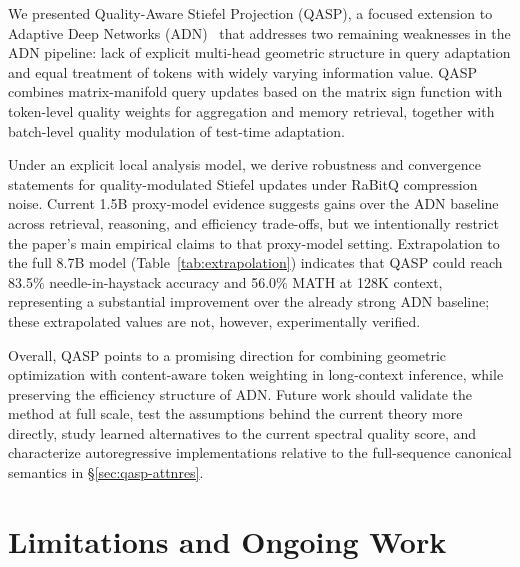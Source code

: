 \documentclass[twocolumn]{article}
\begin{document}
We presented Quality-Aware Stiefel Projection (QASP), a focused extension to Adaptive Deep Networks (ADN)~\cite{adn} that addresses two remaining weaknesses in the ADN pipeline: lack of explicit multi-head geometric structure in query adaptation and equal treatment of tokens with widely varying information value. QASP combines matrix-manifold query updates based on the matrix sign function with token-level quality weights for aggregation and memory retrieval, together with batch-level quality modulation of test-time adaptation.

Under an explicit local analysis model, we derive robustness and convergence statements for quality-modulated Stiefel updates under RaBitQ compression noise. Current 1.5B proxy-model evidence suggests gains over the ADN baseline across retrieval, reasoning, and efficiency trade-offs, but we intentionally restrict the paper's main empirical claims to that proxy-model setting. Extrapolation to the full 8.7B model (Table~\ref{tab:extrapolation}) indicates that QASP could reach 83.5\% needle-in-haystack accuracy and 56.0\% MATH at 128K context, representing a substantial improvement over the already strong ADN baseline; these extrapolated values are not, however, experimentally verified.

Overall, QASP points to a promising direction for combining geometric optimization with content-aware token weighting in long-context inference, while preserving the efficiency structure of ADN. Future work should validate the method at full scale, test the assumptions behind the current theory more directly, study learned alternatives to the current spectral quality score, and characterize autoregressive implementations relative to the full-sequence canonical semantics in \S\ref{sec:qasp-attnres}.

\section*{Limitations and Ongoing Work}
\end{document}
